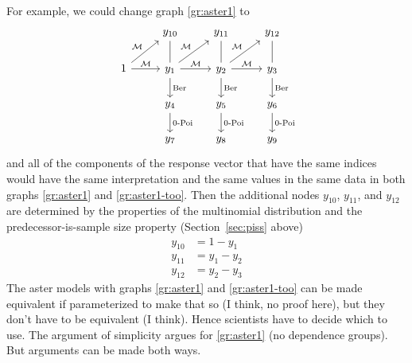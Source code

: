 For example, we could change graph \eqref{gr:aster1} to
\begin{equation} \label{gr:aster1-too}
\begin{tikzcd}
  \hphantom{1} & y_{10} & y_{11} & y_{12}
  \\
  1
  \arrow{r}{\mathcal{M}}
  \arrow{ru}{\mathcal{M}}
  & y_1
  \arrow[dash]{u}
  \arrow{d}{\text{Ber}}
  \arrow{r}{\mathcal{M}}
  \arrow{ru}{\mathcal{M}}
  & y_2
  \arrow[dash]{u}
  \arrow{d}{\text{Ber}}
  \arrow{r}{\mathcal{M}}
  \arrow{ru}{\mathcal{M}}
  & y_3
  \arrow[dash]{u}
  \arrow{d}{\text{Ber}}
  \\
  \hphantom{1} & y_4 \arrow{d}{\text{0-Poi}}
  & y_5 \arrow{d}{\text{0-Poi}}
  & y_6 \arrow{d}{\text{0-Poi}}
  \\
  \hphantom{1} & y_7 & y_8 & y_9
\end{tikzcd}
\end{equation}
and all of the components of the response vector that have the same indices
would have the same interpretation and the same values in the same data
in both graphs \eqref{gr:aster1} and \eqref{gr:aster1-too}.
Then the additional nodes $y_{10}$, $y_{11}$, and $y_{12}$ are determined
by the properties of the multinomial distribution
and the predecessor-is-sample size property (Section~\ref{sec:piss} above)
\begin{equation} \label{eq:bernoulli-multinomial-constraints}
\begin{split}
   y_{10} & = 1 - y_1
   \\
   y_{11} & = y_1 - y_2
   \\
   y_{12} & = y_2 - y_3
\end{split}
\end{equation}
The aster models with graphs \eqref{gr:aster1} and \eqref{gr:aster1-too}
can be made equivalent if parameterized to make that so (I think, no proof
here), but they don't have to be equivalent (I think).
Hence scientists have to decide which to use.  The argument of simplicity
argues for \eqref{gr:aster1} (no dependence groups).
But arguments can be made both ways.

